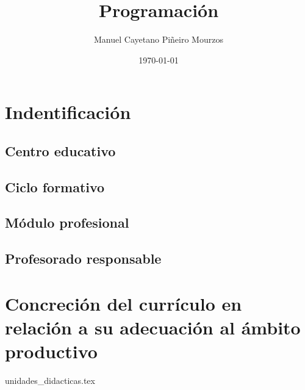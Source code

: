 \documentclass[a4paper,oneside,titlepage,12pt]{article}
\title{Programación}
\author{Manuel Cayetano Piñeiro Mourzos}
\date{\today}
\begin{document}
\maketitle
\tableofcontents

\newpage

\section{Indentificación}
\subsection{Centro educativo}
\subsection{Ciclo formativo}
\subsection{Módulo profesional}
\subsection{Profesorado responsable}

\section{Concreción del currículo en relación a su adecuación al ámbito productivo}

{unidades_didacticas.tex}
\end{document}
